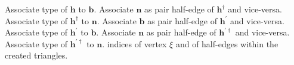 \documentclass[aps, superscriptaddress, notitlepage]{revtex4-1}
\begin{document}
\begin{algorithm}[H]
\begin{algorithmic}[1]
\STATEx Associate type of $\boldsymbol{h}$ to $\boldsymbol{b}$.
\STATE Associate $\boldsymbol{n}$ as pair half-edge of $\boldsymbol{h}^{\dagger}$ and vice-versa.
\STATEx Associate type of $\boldsymbol{h}^{\dagger}$ to $\boldsymbol{n}$.
 
 
\STATE Associate $\boldsymbol{b}$ as pair half-edge of $\boldsymbol{h}^{\prime}$ and vice-versa.
\STATEx Associate type of $\boldsymbol{h}^{\prime}$ to $\boldsymbol{b}$.
\STATE Associate $\boldsymbol{n}$ as pair half-edge of $\boldsymbol{h}^{\prime\dagger}$ and vice-versa.
\STATEx Associate type of $\boldsymbol{h}^{\prime\dagger}$ to $\boldsymbol{n}$.
\RETURN indices of vertex $\xi$ and of half-edges within the created triangles.
\end{algorithmic}
\end{algorithm}
\end{document}
